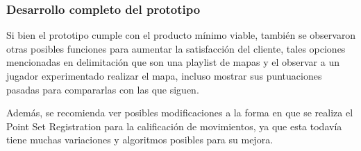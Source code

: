 \subsubsection{Desarrollo completo del prototipo}

Si bien el prototipo cumple con el producto mínimo viable, también se observaron otras posibles funciones para aumentar la satisfacción del cliente, tales opciones mencionadas en delimitación que son una playlist de mapas y el observar a un jugador experimentado realizar el mapa, incluso mostrar sus puntuaciones pasadas para compararlas con las que siguen.

Además, se recomienda ver posibles modificaciones a la forma en que se realiza el Point Set Registration para la calificación de movimientos, ya que esta todavía tiene muchas variaciones y algoritmos posibles para su mejora.
